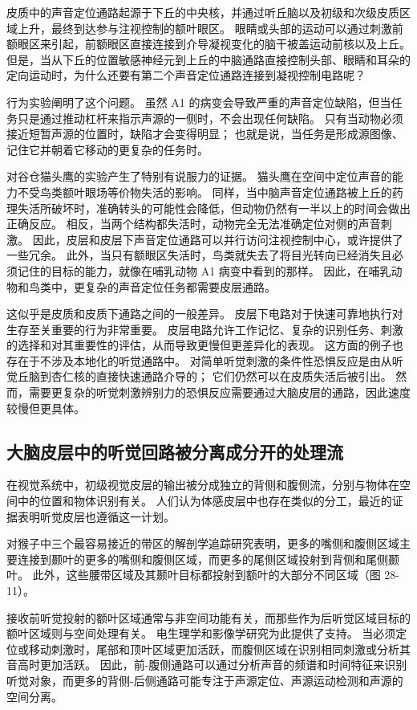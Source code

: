 皮质中的声音定位通路起源于下丘的中央核，并通过听丘脑以及初级和次级皮质区域上升，最终到达参与注视控制的额叶眼区。 眼睛或头部的运动可以通过刺激前额眼区来引起，前额眼区直接连接到介导凝视变化的脑干被盖运动前核以及上丘。 但是，当从下丘的位置敏感神经元到上丘的中脑通路直接控制头部、眼睛和耳朵的定向运动时，为什么还要有第二个声音定位通路连接到凝视控制电路呢？

行为实验阐明了这个问题。 虽然 A1 的病变会导致严重的声音定位缺陷，但当任务只是通过推动杠杆来指示声源的一侧时，不会出现任何缺陷。 只有当动物必须接近短暂声源的位置时，缺陷才会变得明显； 也就是说，当任务是形成源图像、记住它并朝着它移动的更复杂的任务时。

对谷仓猫头鹰的实验产生了特别有说服力的证据。 猫头鹰在空间中定位声音的能力不受鸟类额叶眼场等价物失活的影响。 同样，当中脑声音定位通路被上丘的药理失活所破坏时，准确转头的可能性会降低，但动物仍然有一半以上的时间会做出正确反应。 相反，当两个结构都失活时，动物完全无法准确定位对侧的声音刺激。 因此，皮层和皮层下声音定位通路可以并行访问注视控制中心，或许提供了一些冗余。 此外，当只有额眼区失活时，鸟类就失去了将目光转向已经消失且必须记住的目标的能力，就像在哺乳动物 A1 病变中看到的那样。 因此，在哺乳动物和鸟类中，更复杂的声音定位任务都需要皮层通路。

这似乎是皮质和皮质下通路之间的一般差异。 皮层下电路对于快速可靠地执行对生存至关重要的行为非常重要。 皮层电路允许工作记忆、复杂的识别任务、刺激的选择和对其重要性的评估，从而导致更慢但更差异化的表现。 这方面的例子也存在于不涉及本地化的听觉通路中。 对简单听觉刺激的条件性恐惧反应是由从听觉丘脑到杏仁核的直接快速通路介导的； 它们仍然可以在皮质失活后被引出。 然而，需要更复杂的听觉刺激辨别力的恐惧反应需要通过大脑皮层的通路，因此速度较慢但更具体。

\subsection{大脑皮层中的听觉回路被分离成分开的处理流}
在视觉系统中，初级视觉皮层的输出被分成独立的背侧和腹侧流，分别与物体在空间中的位置和物体识别有关。 人们认为体感皮层中也存在类似的分工，最近的证据表明听觉皮层也遵循这一计划。

对猴子中三个最容易接近的带区的解剖学追踪研究表明，更多的嘴侧和腹侧区域主要连接到颞叶的更多的嘴侧和腹侧区域，而更多的尾侧区域投射到背侧和尾侧颞叶。 此外，这些腰带区域及其颞叶目标都投射到额叶的大部分不同区域（图 28-11）。

接收前听觉投射的额叶区域通常与非空间功能有关，而那些作为后听觉区域目标的额叶区域则与空间处理有关。 电生理学和影像学研究为此提供了支持。 当必须定位或移动刺激时，尾部和顶叶区域更加活跃，而腹侧区域在识别相同刺激或分析其音高时更加活跃。 因此，前-腹侧通路可以通过分析声音的频谱和时间特征来识别听觉对象，而更多的背侧-后侧通路可能专注于声源定位、声源运动检测和声源的空间分离。

